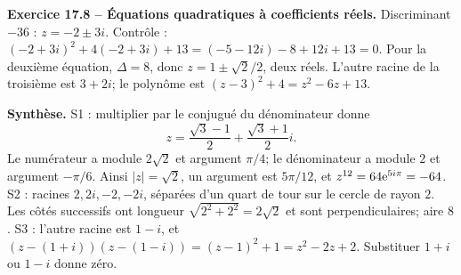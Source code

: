 \begin{answerbox}
\textbf{Exercice 17.8 -- Équations quadratiques à coefficients réels.} Discriminant $-36$ : $z=-2\pm3i$. Contrôle : $(-2+3i)^2+4(-2+3i)+13=(-5-12i)-8+12i+13=0$. Pour la deuxième équation, $\Delta=8$, donc $z=1\pm\sqrt2/2$, deux réels. L'autre racine de la troisième est $3+2i$; le polynôme est $(z-3)^2+4=z^2-6z+13$.\par
\medskip\textbf{Synthèse.} S1 : multiplier par le conjugué du dénominateur donne
\[
z=\frac{\sqrt3-1}{2}+\frac{\sqrt3+1}{2}i.
\]
Le numérateur a module $2\sqrt2$ et argument $\pi/4$; le dénominateur a module $2$ et argument $-\pi/6$. Ainsi $|z|=\sqrt2$, un argument est $5\pi/12$, et $z^{12}=64\mathrm e^{5i\pi}=-64$. S2 : racines $2,2i,-2,-2i$, séparées d'un quart de tour sur le cercle de rayon $2$. Les côtés successifs ont longueur $\sqrt{2^2+2^2}=2\sqrt2$ et sont perpendiculaires; aire $8$. S3 : l'autre racine est $1-i$, et $(z-(1+i))(z-(1-i))=(z-1)^2+1=z^2-2z+2$. Substituer $1+i$ ou $1-i$ donne zéro.
\end{answerbox}
